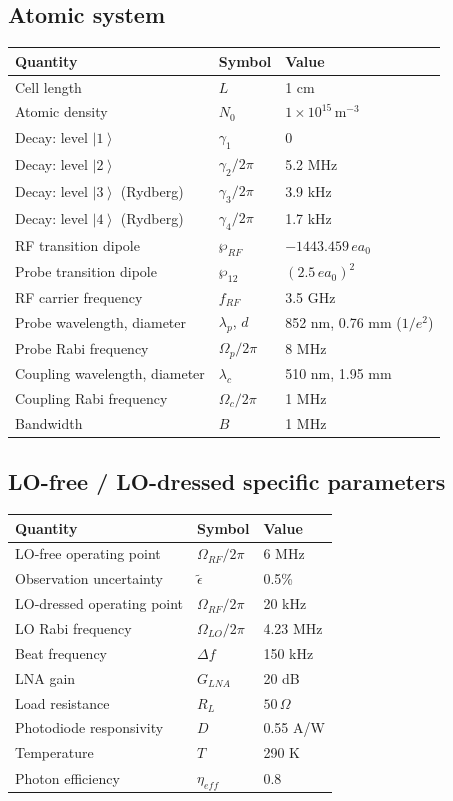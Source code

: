 \documentclass[11pt]{article}
\newcommand{\ket}[1]{\left|#1\right\rangle}
\begin{document}
\subsection*{Atomic system}
\begin{center}
\begin{tabular}{@{}lll@{}}
\toprule
Quantity & Symbol & Value \\ \midrule
Cell length & $L$ & 1 cm \\
Atomic density & $N_0$ & $1\times10^{15}\,\text{m}^{-3}$ \\
Decay: level $\ket1$ & $\gamma_1$ & 0 \\
Decay: level $\ket2$ & $\gamma_2/2\pi$ & 5.2 MHz \\
Decay: level $\ket3$ (Rydberg) & $\gamma_3/2\pi$ & 3.9 kHz \\
Decay: level $\ket4$ (Rydberg) & $\gamma_4/2\pi$ & 1.7 kHz \\
RF transition dipole & $\wp_{RF}$ & $-1443.459\,ea_0$ \\
Probe transition dipole & $\wp_{12}$ & $(2.5\,ea_0)^2$ \\
RF carrier frequency & $f_{RF}$ & 3.5 GHz \\
Probe wavelength, diameter & $\lambda_p$, $d$ & 852 nm, 0.76 mm ($1/e^2$) \\
Probe Rabi frequency & $\Omega_p/2\pi$ & 8 MHz \\
Coupling wavelength, diameter & $\lambda_c$ & 510 nm, 1.95 mm \\
Coupling Rabi frequency & $\Omega_c/2\pi$ & 1 MHz \\
Bandwidth & $B$ & 1 MHz \\
\bottomrule
\end{tabular}
\end{center}

\subsection*{LO-free / LO-dressed specific parameters}
\begin{center}
\begin{tabular}{@{}lll@{}}
\toprule
Quantity & Symbol & Value \\ \midrule
LO-free operating point & $\Omega_{RF}/2\pi$ & 6 MHz \\
Observation uncertainty & $\tilde\epsilon$ & 0.5\% \\
LO-dressed operating point & $\Omega_{RF}/2\pi$ & 20 kHz \\
LO Rabi frequency & $\Omega_{LO}/2\pi$ & 4.23 MHz \\
Beat frequency & $\Delta f$ & 150 kHz \\
LNA gain & $G_{LNA}$ & 20 dB \\
Load resistance & $R_L$ & $50\,\Omega$ \\
Photodiode responsivity & $D$ & 0.55 A/W \\
Temperature & $T$ & 290 K \\
Photon efficiency & $\eta_{eff}$ & 0.8 \\
\bottomrule
\end{tabular}
\end{center}
\end{document}
